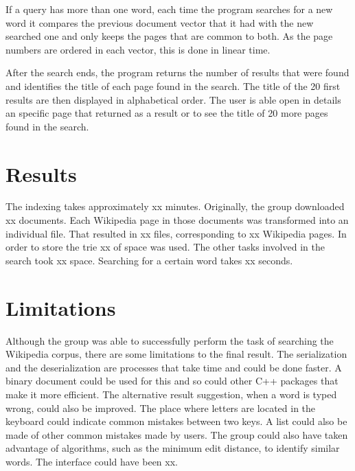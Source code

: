 \documentclass{article}
\begin{document}
If a query has more than one word, each time the program searches for a new word it compares the previous document vector that it had with the new searched one and only keeps the pages that are common to both. As the page numbers are ordered in each vector, this is done in linear time. 

After the search ends, the program returns the number of results that were found and identifies the title of each page found in the search. The title of the 20 first results are then displayed in alphabetical order. The user is able open in details an specific page that returned as a result or to see the title of 20 more pages found in the search. 


\section*{Results}
The indexing takes approximately xx minutes. Originally, the group downloaded xx documents. Each Wikipedia page in those documents was transformed into an individual file. That resulted in xx files, corresponding to xx Wikipedia pages. In order to store the trie xx of space was used. The other tasks involved in the search took xx space. Searching for a certain word takes xx seconds. 

\section*{Limitations}
Although the group was able to successfully perform the task of searching the Wikipedia corpus, there are some limitations to the final result. The serialization and the deserialization are processes that take time and could be done faster. A binary document could be used for this and so could other C++ packages that make it more efficient. The alternative result suggestion, when a word is typed wrong, could also be improved. The place where letters are located in the keyboard could indicate common mistakes between two keys. A list could also be made of other common mistakes made by users. The group could also have taken advantage of algorithms, such as the minimum edit distance, to identify similar words. The interface could have been xx.  

\end{document}
